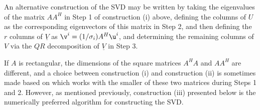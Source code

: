 
\noindent An alternative construction of the SVD may be written by taking the
eigenvalues of the matrix $A A^{H}$ in Step 1 of construction (i) above,
defining the columns of $U$ as the corresponding eigenvectors of this
matrix in Step 2, and then defining the $r$ columns of $\underline V$
as $\v^{i}=(1/\sigma_{i}) A^{H}\u^{i}$, and determining the remaining
columns of $V$ via the $QR$ decomposition of $\underline V$ in Step 3.

If $A$ is rectangular, the dimensions of the square matrices $A^{H} A$
and $A A^{H}$ are different, and a choice between construction (i) and construction (ii) is
sometimes made based on which works with the smaller of these two matrices during Steps 1 and 2.  However, as mentioned previously,
construction (iii) presented below is the numerically preferred algorithm for constructing the SVD.

\clearpage


